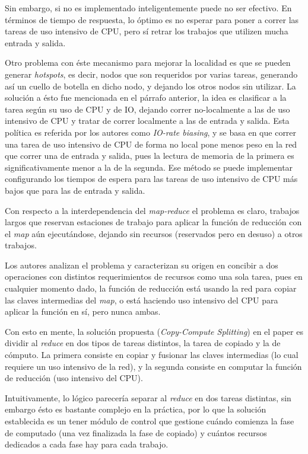 \documentclass[a4paper]{article}
\begin{document}
Sin embargo, si no es implementado inteligentemente puede no ser efectivo. En
términos de tiempo de respuesta, lo óptimo es no esperar para poner a correr
las tareas de uso intensivo de CPU, pero sí retrar los trabajos que utilizen
mucha entrada y salida.

Otro problema con éste mecanismo para mejorar la localidad es que se pueden
generar \textit{hotspots}, es decir, nodos que son requeridos por varias tareas,
generando así un cuello de botella en dicho nodo, y dejando los otros nodos
sin utilizar. La solución a ésto fue mencionada en el párrafo anterior, la idea
es clasificar a la tarea según su uso de CPU y de IO, dejando correr
no-localmente a las de uso intensivo de CPU y tratar de correr localmente a las
de entrada y salida. Esta política es referida por los autores como
\textit{IO-rate biasing}, y se basa en que correr una tarea de uso intensivo de
CPU de forma no local pone menos peso en la red que correr una de entrada y
salida, pues la lectura de memoria de la primera es significativamente menor a
la de la segunda. Ese método se puede implementar configurando los tiempos de
espera para las tareas de uso intensivo de CPU más bajos que para las de
entrada y salida.

Con respecto a la interdependencia del \textit{map-reduce} el problema es
claro, trabajos largos que reservan estaciones de trabajo para
aplicar la función de reducción con el \textit{map} aún ejecutándose, dejando
sin recursos (reservados pero en desuso) a otros trabajos.

Los autores analizan el problema y caracterizan su origen en concibir a dos
operaciones con distintos requerimientos de recursos como una sola tarea, pues
en cualquier momento dado, la función de reducción está usando la red para
copiar las claves intermedias del \textit{map}, o está haciendo uso intensivo
del CPU para aplicar la función en sí, pero nunca ambas.

Con esto en mente, la solución propuesta (\textit{Copy-Compute Splitting}) en el paper es dividir al
\textit{reduce} en dos tipos de tareas distintos, la tarea de copiado y la de
cómputo. La primera consiste en copiar y fusionar las claves intermedias (lo
cual requiere un uso intensivo de la red), y la segunda consiste en computar la
función de reducción (uso intensivo del CPU).

Intuitivamente, lo lógico parecería separar al \textit{reduce} en dos tareas
distintas, sin embargo ésto es bastante complejo en la práctica, por lo que la
solución establecida es un tener módulo de control que gestione cuándo comienza la fase
de computado (una vez finalizada la fase de copiado) y cuántos recursos
dedicados a cada fase hay para cada trabajo.
\end{document}
